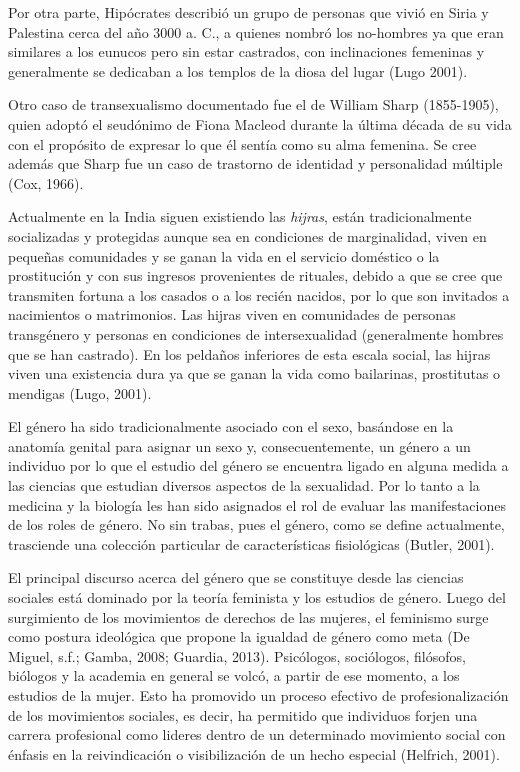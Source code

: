 Por otra parte, Hipócrates describió un grupo de personas que vivió en Siria
y Palestina cerca del año 3000 a. C., a quienes nombró los no-hombres ya que
eran  similares a los eunucos pero sin estar castrados, con inclinaciones
femeninas y generalmente se dedicaban a los templos de la diosa del lugar (Lugo
2001).

Otro caso de transexualismo documentado fue el de William Sharp (1855-1905),
quien adoptó el seudónimo de Fiona Macleod durante la última década de su vida
con el propósito de expresar lo que él sentía como su alma femenina.
Se cree además que Sharp fue un caso de trastorno de identidad y personalidad
múltiple (Cox, 1966).

Actualmente en la India siguen existiendo las \emph{hijras}, están tradicionalmente
socializadas y protegidas aunque sea en condiciones de marginalidad, viven en
pequeñas comunidades y se ganan la vida en el servicio doméstico o la
prostitución y con sus ingresos provenientes de rituales, debido a que se cree
que transmiten fortuna a los casados o a los recién nacidos, por lo que son
invitados a nacimientos o matrimonios.
Las hijras viven en comunidades de personas transgénero y personas en
condiciones de intersexualidad (generalmente hombres que se han castrado).
En los peldaños inferiores de esta escala social, las hijras viven una
existencia dura ya que se ganan la vida como bailarinas, prostitutas o mendigas
(Lugo, 2001).

El género ha sido tradicionalmente asociado con el sexo, basándose en la
anatomía genital para asignar un sexo y, consecuentemente, un género a un
individuo por lo que el estudio del género se encuentra ligado en alguna medida
a las ciencias que estudian diversos aspectos de la sexualidad.
Por lo tanto a la medicina y la biología les han sido asignados el rol de
evaluar las manifestaciones de los roles de género.
No sin trabas, pues el género, como se define actualmente, trasciende una
colección particular de características fisiológicas (Butler, 2001).

El principal discurso acerca del género que se constituye desde las ciencias
sociales está dominado por la teoría feminista y los estudios de género.
Luego del surgimiento de los movimientos de derechos de las mujeres, el
feminismo surge como postura ideológica que propone la igualdad de género como
meta (De Miguel, s.f.; Gamba, 2008; Guardia, 2013).
Psicólogos, sociólogos, filósofos, biólogos y la academia en general se volcó, a
partir de ese momento, a los estudios de la mujer.
Esto ha promovido un proceso efectivo de profesionalización de los movimientos
sociales, es decir, ha permitido que individuos forjen una carrera profesional
como lideres dentro de un determinado movimiento social con énfasis en la
reivindicación o visibilización de un hecho especial (Helfrich, 2001).


